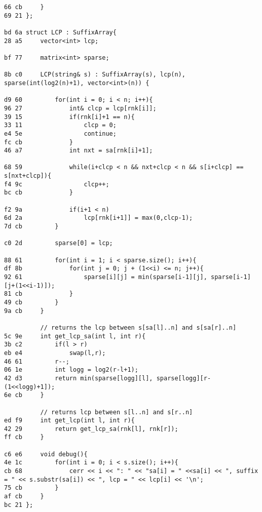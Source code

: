 \documentclass[11pt, a4paper, twoside]{article}
\begin{document}
\begin{lstlisting}
66 cb     }
69 21 };
 
bd 6a struct LCP : SuffixArray{
28 a5     vector<int> lcp;
       
bf 77     matrix<int> sparse;
       
8b c0     LCP(string& s) : SuffixArray(s), lcp(n), sparse(int(log2(n)+1), vector<int>(n)) {        
       
d9 60         for(int i = 0; i < n; i++){
96 27             int& clcp = lcp[rnk[i]];
39 15             if(rnk[i]+1 == n){
33 11                 clcp = 0;
e4 5e                 continue;
fc cb             }
46 a7             int nxt = sa[rnk[i]+1];
                  
68 59             while(i+clcp < n && nxt+clcp < n && s[i+clcp] == s[nxt+clcp]){
f4 9c                 clcp++;
bc cb             }
                  
f2 9a             if(i+1 < n)
6d 2a                 lcp[rnk[i+1]] = max(0,clcp-1);
7d cb         }
       
c0 2d         sparse[0] = lcp;
       
88 61         for(int i = 1; i < sparse.size(); i++){
df 8b             for(int j = 0; j + (1<<i) <= n; j++){
92 61                 sparse[i][j] = min(sparse[i-1][j], sparse[i-1][j+(1<<i-1)]);
81 cb             }
49 cb         }
9a cb     }
          
          // returns the lcp between s[sa[l]..n] and s[sa[r]..n]
5c 9e     int get_lcp_sa(int l, int r){
3b c2         if(l > r)
eb e4             swap(l,r);
46 61         r--;
06 1e         int logg = log2(r-l+1);
42 d3         return min(sparse[logg][l], sparse[logg][r-(1<<logg)+1]);
6e cb     }
      
          // returns lcp between s[l..n] and s[r..n]
ed f9     int get_lcp(int l, int r){
42 29         return get_lcp_sa(rnk[l], rnk[r]);
ff cb     }
      
c6 e6     void debug(){
4e 1c         for(int i = 0; i < s.size(); i++){
cb 68             cerr << i << ": " << "sa[i] = " <<sa[i] << ", suffix = " << s.substr(sa[i]) << ", lcp = " << lcp[i] << '\n';
75 cb         }
af cb     }
bc 21 };
\end{lstlisting}
\end{document}

